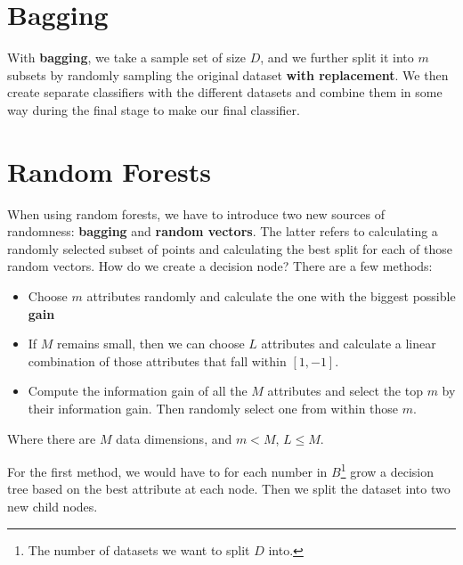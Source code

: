 \documentclass{tufte-handout}
\begin{document}
\section{Bagging}
With \textbf{bagging}, we take a sample set of size $D$, and we further split it into $m$ subsets by 
randomly sampling the original dataset \textbf{with replacement}. We then create separate classifiers
with the different datasets and combine them in some way during the final stage to make our final 
classifier.

\section{Random Forests}
When using random forests, we have to introduce two new sources of randomness: \textbf{bagging} and
\textbf{random vectors}. The latter refers to calculating a randomly selected subset of points 
and calculating the best split for each of those random vectors. How do we create a decision node?
There are a few methods:
\begin{itemize}
		\item Choose $m$ attributes randomly and calculate the one with the biggest possible \textbf{gain}
		\item If $M$ remains small, then we can choose $L$ attributes and calculate a linear combination of 
				those attributes that fall within $[1, -1]$.
		\item Compute the information gain of all the $M$ attributes and select the top $m$ by their information
				gain. Then randomly select one from within those $m$.
\end{itemize}
Where there are $M$ data dimensions, and $m < M$, $L\leq M$.

For the first method, we would have to for each number in $B$\footnote{The number of datasets we want to split 
$D$ into.} grow a decision tree based on the	best attribute at each node. Then we split the dataset into two
new child nodes.
\end{document}
